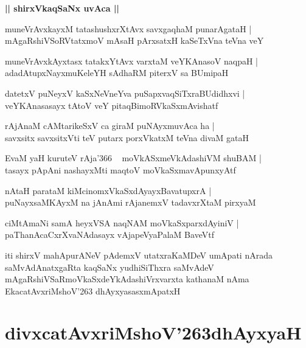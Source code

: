 \documentclass[twoside,12pt,openright]{book}
\def\S{\char'263}
\newcounter{shloka}[chapter]
\def\uvaca#1{\centerline{{\large\textbf{#1}}}}
\begin{document}
\uvaca{|| shirxVkaqSaNx uvAca ||}

\begin{shloka}%
muneVrAvxkayxM tatashushxrXtAvx savxgaqhaM punarAgataH |\\
mAgaRshiVSoRVtatxmoV mAsaH pArxsatxH kaSeTxVna teVna veY 
\end{shloka}

\begin{shloka}%
muneVrAvxkAyxtasx tatakxYtAvx varxtaM veYKAnasoV naqpaH |\\
adadAtupxNayxmuKeleYH sAdhaRM piterxV sa BUmipaH 
\end{shloka}

\begin{shloka}%
datetxV puNeyxV kaSxNeVneYva puSapxvaqSiTxraBUdidhxvi |\\
veYKAnasasayx tAtoV veY pitaqBimoRVkaSxmAvishatf
\end{shloka}

\begin{shloka}%
rAjAnaM cAMtarikeSxV ca giraM puNAyxmuvAca ha |\\
savxsitx savxsitxVti teV putarx porxVkatxM teVna divaM gataH 
\end{shloka}

\begin{shloka}%
EvaM yaH kuruteV rAja\char'366 ~ moVkASxmeVkAdashiVM shuBAM |\\
tasayx pApAni nashayxMti maqtoV moVkaSxmavApunxyAtf
\end{shloka}

\begin{shloka}%
nAtaH parataM kiMcinomxVkaSxdAyayxBavatupxrA |\\
puNayxsaMKAyxM na jAnAmi rAjanemxV tadavxrXtaM pirxyaM 
\end{shloka}

\begin{shloka}%
ciMtAmaNi samA heyxVSA naqNAM moVkaSxparxdAyiniV |\\
paThanAcaCxrXvaNAdasayx vAjapeVyaPalaM BaveVtf
\end{shloka}

\begin{center}
iti shirxV mahApurANeV pAdemxV utatxraKaMDeV umApati nArada 
saMvAdAnatxgaRta kaqSaNx yudhiSiThxra saMvAdeV 
mAgaRshiVSaRmoVkaSxdeYkAdashiVrxvarxta kathanaM nAma EkacatAvxriMshoV\S 
dhAyxyasasxmApatxH 
\end{center}

\chapter{divxcatAvxriMshoV\S dhAyxyaH}
\end{document}

